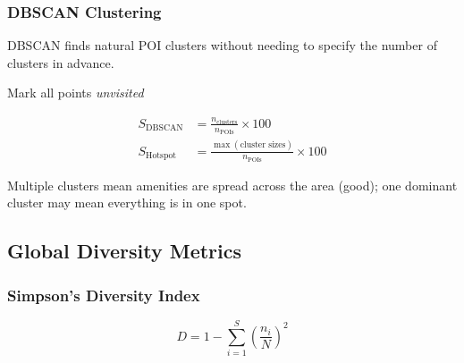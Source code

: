 \documentclass[11pt,a4paper]{article}
\begin{document}
\subsubsection{DBSCAN Clustering}

DBSCAN finds natural POI clusters without needing to specify the number of clusters in advance.

\begin{algorithm}[H]
\caption{DBSCAN --- POI hub detection}
Mark all points \textit{unvisited}\;
\end{algorithm}

\begin{align}
S_{\text{DBSCAN}}  &= \frac{n_{\text{clusters}}}{n_{\text{POIs}}} \times 100 \\[4pt]
S_{\text{Hotspot}} &= \frac{\max(\text{cluster sizes})}{n_{\text{POIs}}} \times 100
\end{align}

Multiple clusters mean amenities are spread across the area (good); one dominant cluster may mean everything is in one spot.

\subsection{Global Diversity Metrics}

\subsubsection{Simpson's Diversity Index}

\begin{equation}
D = 1 - \sum_{i=1}^{S}\!\left(\frac{n_i}{N}\right)^{\!2}
\end{equation}
\end{document}
